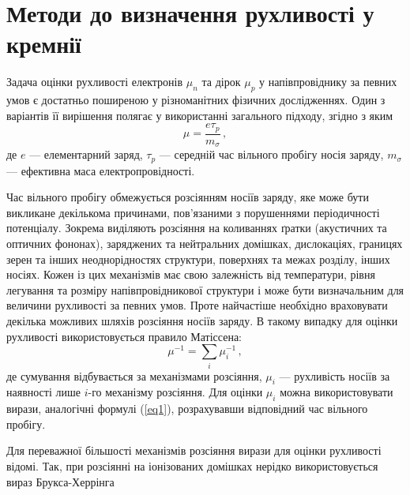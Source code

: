 \documentclass[10pt,a5paper,titlepage,oneside]{book}
\numberwithin{equation}{part}
\renewcommand{\theequation}{\thechapter.\arabic{equation}}
\begin{document}

\setcounter{chapter}{1}
\setcounter{section}{1}

\section{Методи до визначення рухливості у кремнії}

Задача оцінки рухливості електронів $\mu_n$ та дірок $\mu_p$ у напівпровіднику 
за певних умов є достатньо поширеною у різноманітних фізичних дослідженнях.
Один з варіантів її вирішення полягає у використанні загального підходу, згідно з яким
\begin{equation}\label{eq1}
  \mu=\frac{e\tau_p}{m_\sigma}\,,
\end{equation}
де
$e$ --- елементарний заряд,
$\tau_p$ --- середній час вільного пробігу носія заряду,
$m_\sigma$ --- ефективна маса електропровідності.

Час вільного пробігу обмежується розсіянням носіїв заряду, яке може бути викликане декількома причинами,
пов'язаними з порушеннями періодичності потенціалу.
Зокрема виділяють розсіяння на коливаннях ґратки (акустичних та оптичних фононах), заряджених та нейтральних домішках,
дислокаціях, границях зерен та інших неоднорідностях структури, поверхнях та межах розділу, інших носіях.
Кожен із цих механізмів має свою залежність від температури, рівня легування та розміру напівпровідникової структури
і може бути визначальним для величини рухливості за певних умов.
Проте найчастіше необхідно враховувати декілька можливих шляхів розсіяння носіїв заряду.
В такому випадку для оцінки рухливості використовується правило Матіссена:
\begin{equation}\label{eq2}
  \mu^{-1}=\sum_i \mu_i^{-1}\,,
\end{equation}
де 
сумування відбувається за механізмами розсіяння,
$\mu_i$ --- рухливість носіїв за наявності лише $i$-го механізму розсіяння. 
Для оцінки $\mu_i$ можна використовувати вирази, аналогічні формулі (\ref{eq1}), розрахувавши відповідний час вільного пробігу.

Для переважної більшості механізмів розсіяння вирази для оцінки рухливості відомі.
Так, при розсіянні на іонізованих домішках нерідко використовується вираз Брукса-Херрінга


%



\vspace{-5cm}
\setcounter{page}{3}







\end{document}
